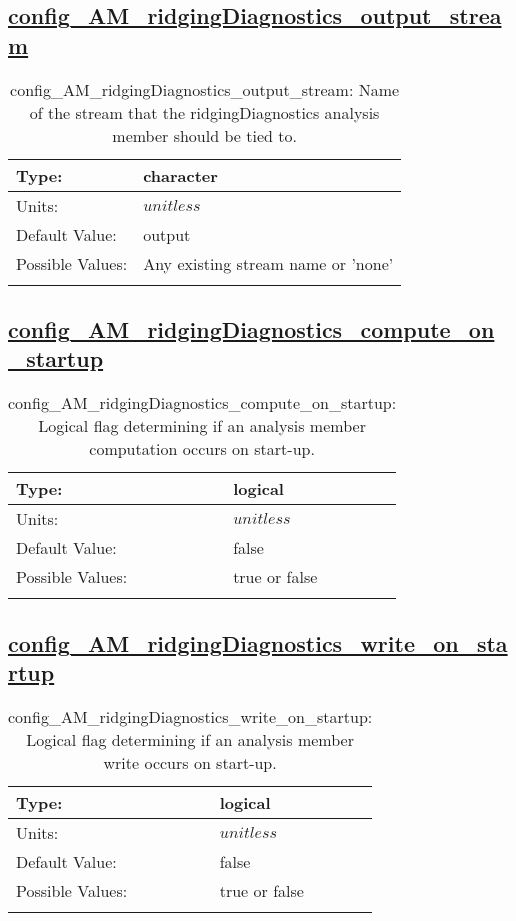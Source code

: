 \subsection[config\_AM\_ridgingDiagnostics\_output\_stream]{\hyperref[sec:nm_tab_AM_ridgingDiagnostics]{config\_AM\_ridgingDiagnostics\_output\_stream}}
\label{subsec:nm_sec_config_AM_ridgingDiagnostics_output_stream}
\begin{center}
\begin{longtable}{| p{2.0in} || p{4.0in} |}
    \hline
    Type: & character \\
    \hline
    Units: & $unitless$ \\
    \hline
    Default Value: & output \\
    \hline
    Possible Values: & Any existing stream name or 'none' \\
    \hline
    \caption{config\_AM\_ridgingDiagnostics\_output\_stream: Name of the stream that the ridgingDiagnostics analysis member should be tied to.}
\end{longtable}
\end{center}
\subsection[config\_AM\_ridgingDiagnostics\_compute\_on\_startup]{\hyperref[sec:nm_tab_AM_ridgingDiagnostics]{config\_AM\_ridgingDiagnostics\_compute\_on\_startup}}
\label{subsec:nm_sec_config_AM_ridgingDiagnostics_compute_on_startup}
\begin{center}
\begin{longtable}{| p{2.0in} || p{4.0in} |}
    \hline
    Type: & logical \\
    \hline
    Units: & $unitless$ \\
    \hline
    Default Value: & false \\
    \hline
    Possible Values: & true or false \\
    \hline
    \caption{config\_AM\_ridgingDiagnostics\_compute\_on\_startup: Logical flag determining if an analysis member computation occurs on start-up.}
\end{longtable}
\end{center}
\subsection[config\_AM\_ridgingDiagnostics\_write\_on\_startup]{\hyperref[sec:nm_tab_AM_ridgingDiagnostics]{config\_AM\_ridgingDiagnostics\_write\_on\_startup}}
\label{subsec:nm_sec_config_AM_ridgingDiagnostics_write_on_startup}
\begin{center}
\begin{longtable}{| p{2.0in} || p{4.0in} |}
    \hline
    Type: & logical \\
    \hline
    Units: & $unitless$ \\
    \hline
    Default Value: & false \\
    \hline
    Possible Values: & true or false \\
    \hline
    \caption{config\_AM\_ridgingDiagnostics\_write\_on\_startup: Logical flag determining if an analysis member write occurs on start-up.}
\end{longtable}
\end{center}
